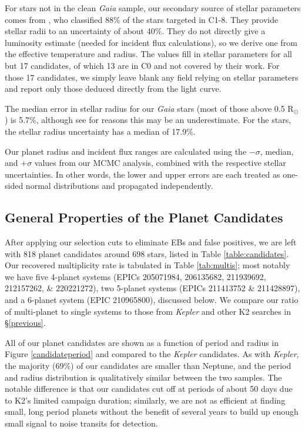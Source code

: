 \documentclass[twocolumn]{aastex62}
\newcommand{\project}[1]{\textsl{#1}}
\newcommand{\nplanet}{818}
\newcommand{\nplanethost}{698}
\newcommand{\nostellar}{17}
\newcommand{\nostellarczero}{13}
\newcommand{\rserrgaia}{5.7}
\newcommand{\rserrhuber}{17.9}
\newcommand{\smallnep}{69}
\begin{document}
For stars not in the clean \project{Gaia} sample, our secondary source
of stellar parameters comes from \cite{hub16}, who classified 88\% of
the stars targeted in C1-8. They provide stellar radii to an
uncertainty of about 40\%. They do not directly give a luminosity
estimate (needed for incident flux calculations), so we derive one
from the effective temperature and radius. The \cite{hub16} values
fill in stellar parameters for all but \nostellar{} candidates, of
which \nostellarczero{} are in C0 and not covered by their work.  For
those \nostellar{} candidates, we simply leave blank any field relying
on stellar parameters and report only those deduced directly from the
light curve.

The median error in stellar radius for our \project{Gaia} stars (most
of those above 0.5 R$_\odot$) is \rserrgaia{}\%, although see
\cite{and18} for reasons this may be an underestimate. For the
\cite{hub16} stars, the stellar radius uncertainty has a median of
\rserrhuber{}\%.

Our planet radius and incident flux ranges are calculated using the
$-\sigma$, median, and $+\sigma$ values from our MCMC analysis,
combined with the respective stellar uncertainties. In other words,
the lower and upper errors are each treated as one-sided normal
distributions and propagated independently.


\subsection{General Properties of the Planet Candidates}
\label{sec:general_properties}

After applying our selection cuts to eliminate EBs and false
positives, we are left with \nplanet{} planet candidates around
\nplanethost{} stars, listed in Table \ref{table:candidates}.  Our
recovered multiplicity rate is tabulated in Table \ref{tab:multis};
most notably we have five 4-planet systems (EPICs 205071984,
206135682, 211939692, 212157262, \& 220221272), two 5-planet systems
(EPICs 211413752 \& 211428897), and a 6-planet system (EPIC
210965800), discussed below. We compare our ratio of multi-planet to
single systems to those from \project{Kepler} and other K2 searches in
\S\ref{previous}.

All of our planet candidates are shown as a function of period and
radius in Figure \ref{candidateperiod} and compared to the
\project{Kepler} candidates. As with \project{Kepler}, the majority
(\smallnep{}\%) of our candidates are smaller than Neptune, and the
period and radius distribution is qualitatively similar between the
two samples. The notable difference is that our candidates cut off at
periods of about 50 days due to K2's limited campaign duration;
similarly, we are not as efficient at finding small, long period
planets without the benefit of several years to build up enough small
signal to noise transits for detection.
\end{document}
